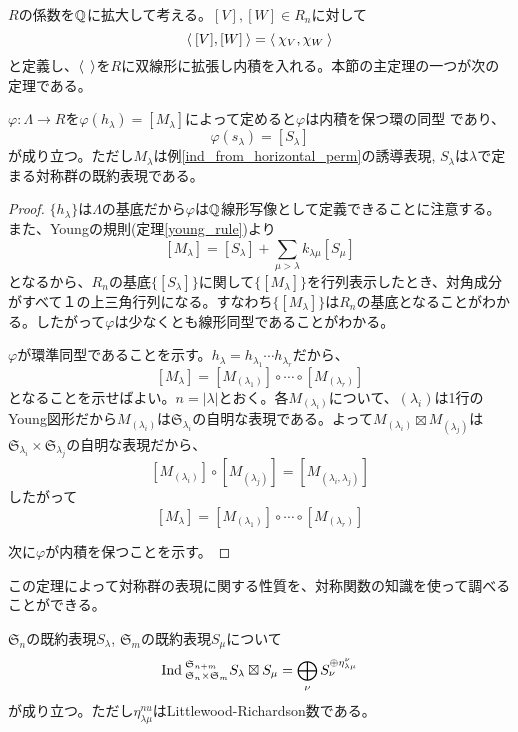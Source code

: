 \documentclass{ltjsreport}
\begin{document}
$R$の係数を$\mathbb{Q}$に拡大して考える。$[V],[W]\in R_n$に対して
\[
\langle\:[V],[W]\:\rangle=\langle\:\chi_V,\chi_W\:\rangle  
\]
と定義し、$\langle\:\:\rangle$を$R$に双線形に拡張し内積を入れる。本節の主定理の一つが次の定理である。

\begin{theo}\label{rep_ring_and_func_ring}
  $\varphi:\Lambda\rightarrow R$を$\varphi(h_\lambda)=[M_\lambda]$によって定めると$\varphi$は内積を保つ環の同型
  であり、
  \[
  \varphi(s_\lambda)=[S_\lambda]
  \]
  が成り立つ。ただし$M_\lambda$は例\ref{ind_from_horizontal_perm}の誘導表現, $S_\lambda$は$\lambda$で定まる対称群の既約表現である。
\end{theo}

\begin{proof}
  $\{h_\lambda\}$は$\Lambda$の基底だから$\varphi$は$\mathbb{Q}$線形写像として定義できることに注意する。また、Youngの規則(定理\ref{young_rule})より
  \[
  [M_\lambda]=[S_\lambda]+\sum_{\mu>\lambda}k_{\lambda\mu}[S_\mu]
  \]
  となるから、$R_n$の基底$\{[S_\lambda]\}$に関して$\{[M_\lambda]\}$を行列表示したとき、対角成分がすべて１の上三角行列になる。すなわち$\{[M_\lambda]\}$は$R_n$の基底となることがわかる。したがって$\varphi$は少なくとも線形同型であることがわかる。

  $\varphi$が環準同型であることを示す。$h_\lambda=h_{\lambda_1}\cdots h_{\lambda_r}$だから、
  \[
  [M_\lambda]=[M_{(\lambda_1)}]\circ\cdots\circ[M_{(\lambda_r)}]  
  \]
  となることを示せばよい。$n=|\lambda|$とおく。各$M_{(\lambda_i)}$について、$(\lambda_i)$は1行のYoung図形だから$M_{(\lambda_i)}$は$\mathfrak{S}_{\lambda_i}$の自明な表現である。よって$M_{(\lambda_i)}\boxtimes M_{(\lambda_j)}$は$\mathfrak{S}_{\lambda_i}\times\mathfrak{S}_{\lambda_j}$の自明な表現だから、
  \[
  [M_{(\lambda_i)}]\circ[M_{(\lambda_j)}]=[M_{(\lambda_i,\lambda_j)}]
  \]
  したがって
  \[
  [M_\lambda]=[M_{(\lambda_1)}]\circ\cdots\circ[M_{(\lambda_r)}]  
  \]
  
  次に$\varphi$が内積を保つことを示す。
\end{proof}



この定理によって対称群の表現に関する性質を、対称関数の知識を使って調べることができる。

\begin{cor}
  $\mathfrak{S}_n$の既約表現$S_\lambda$, $\mathfrak{S}_m$の既約表現$S_\mu$について
  \[
  \text{Ind}\:_{\mathfrak{S}_n\times\mathfrak{S}_m}^{\mathfrak{S}_{n+m}}S_\lambda\boxtimes S_\mu =\bigoplus_{\nu}S_\nu^{\oplus\eta^{\nu}_{\lambda\mu}} 
  \]
  が成り立つ。ただし$\eta^{nu}_{\lambda\mu}$はLittlewood-Richardson数である。
\end{cor}
\end{document}
